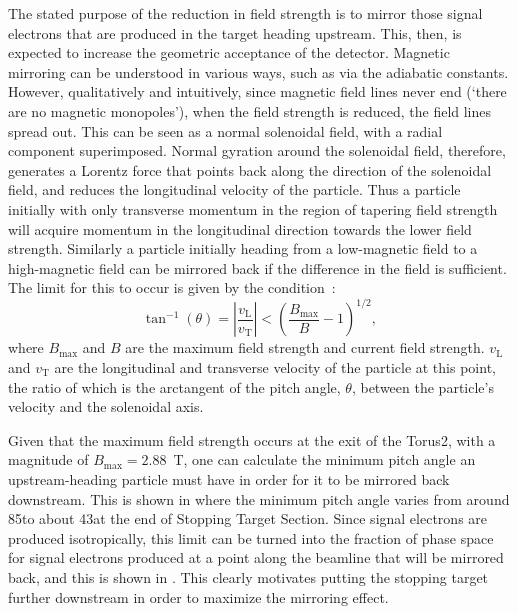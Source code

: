 The stated purpose of the reduction in field strength is to mirror those signal electrons that are produced in the target heading upstream.
This, then, is expected to increase the geometric acceptance of the detector.
Magnetic mirroring can be understood in various ways, such as via the adiabatic constants.
However, qualitatively and intuitively, since magnetic field lines never end (`there are no magnetic monopoles'), when the field strength is reduced, the field lines spread out.
This can be seen as a normal solenoidal field, with a radial component superimposed.
  Normal gyration around the solenoidal field, therefore, generates a Lorentz force that points back along the direction of the solenoidal field, and reduces the longitudinal velocity of the particle.
Thus a particle initially with only transverse momentum in the region of tapering field strength will acquire momentum in the longitudinal direction towards the lower field strength.
Similarly a particle initially heading from a low-magnetic field to a high-magnetic field can be mirrored back if the difference in the field is sufficient.
The limit for this to occur is given by the condition~\cite{Jackson}:
\begin{equation}
\tan^{-1}(\theta)=\left|\frac{v_\mathrm{L}}{v_\mathrm{T}}\right|<\left(\frac{B_\textrm{max}}{B}-1\right)^{1/2},
\end{equation}
where $B_\textrm{max}$ and $B$ are the maximum field strength and current field strength.
$v_\textrm{L}$ and $v_\textrm{T}$ are the longitudinal and transverse velocity of the particle at this point, the ratio of which is the arctangent of the pitch angle, $\theta$, between the particle's velocity and the solenoidal axis.

Given that the maximum field strength occurs at the exit of the Torus2, with a magnitude of $B_\textrm{max}=2.88$~T, one can calculate the minimum pitch angle an upstream-heading particle must have in order for it to be mirrored back downstream.
This is shown in  where the minimum pitch angle varies from around 85\degree to about 43\degree at the end of Stopping Target Section.
Since signal electrons are produced isotropically, this limit can be turned into the fraction of phase space for signal electrons produced at a point along the beamline that will be mirrored back, and this is shown in .
This clearly motivates putting the stopping target further downstream in order to maximize the mirroring effect.

